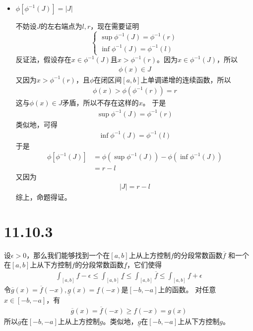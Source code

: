 \documentclass{article}
\begin{document}
\begin{itemize}
  \item $\phi[\phi^{-1}(J)] = |J|$

        不妨设$J$的左右端点为$l, r$，现在需要证明
        \begin{equation*}
          \begin{cases*}
            \sup \phi^{-1}(J) = \phi^{-1}(r) \\
            \inf \phi^{-1}(J) = \phi^{-1}(l)
          \end{cases*}
        \end{equation*}
        反证法，假设存在$x \in \phi^{-1}(J)$且$x > \phi^{-1}(r)$。因为$x \in \phi^{-1}(J)$，所以
        \begin{align*}
          \phi(x) \in J
        \end{align*}
        又因为$x > \phi^{-1}(r)$，且$\phi$在闭区间$[a, b]$上单调递增的连续函数，所以
        \begin{align*}
          \phi(x) > \phi(\phi^{-1}(r)) = r
        \end{align*}
        这与$\phi(x) \in J$矛盾，所以不存在这样的$x$。
        于是
        \begin{align*}
          \sup \phi^{-1}(J) = \phi^{-1}(r)
        \end{align*}
        类似地，可得
        \begin{align*}
          \inf \phi^{-1}(J) = \phi^{-1}(l)
        \end{align*}
        于是
        \begin{align*}
          \phi[\phi^{-1}(J)] & = \phi(\sup \phi^{-1}(J)) - \phi(\inf \phi^{-1}(J)) \\
                             & = r - l
        \end{align*}
        又因为
        \begin{align*}
          |J| = r - l
        \end{align*}
        综上，命题得证。
\end{itemize}

\section*{11.10.3}

设$\epsilon > 0$，那么我们能够找到一个在$[a,b]$上从上方控制$f$的分段常数函数$\overline{f}$
和一个在$[a,b]$上从下方控制$f$的分段常数函数$\underline{f}$，它们使得
\begin{align*}
  \int_{[a,b]} f - \epsilon \leq \int_{[a,b]} \underline{f} \leq \int_{[a,b]} \overline{f} \leq \int_{[a,b]} f + \epsilon
\end{align*}
令$\overline{g}(x) = \overline{f}(-x), \underline{g}(x) = \underline{f}(-x)$是$[-b, -a]$上的函数。
对任意$x \in [-b, -a]$，有
\begin{align*}
  \overline{g}(x) = \overline{f}(-x) \geq f(-x) = g(x)
\end{align*}
所以$\overline{g}$在$[-b, -a]$上从上方控制$g$。类似地，$\underline{g}$在$[-b, -a]$上从下方控制$g$。
\end{document}
